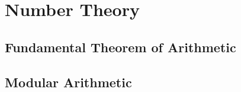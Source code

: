 \chapter{Number Theory}
\section{Fundamental Theorem of Arithmetic}\label{n:n:ftoa}
\section{Modular Arithmetic}
